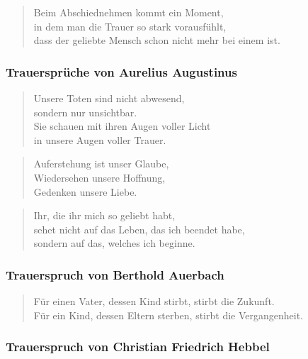 \documentclass[ngerman,a4paper,11pt]{scrreprt}
\begin{document}
\begin{verse}
Beim Abschiednehmen kommt ein Moment, \\
in dem man die Trauer so stark vorausfühlt, \\
dass der geliebte Mensch schon nicht mehr bei einem ist. \\
\end{verse}

\subsubsection*{Trauersprüche von Aurelius Augustinus}
\label{sec-1-1-1-3-6}

\begin{verse}
Unsere Toten sind nicht abwesend, \\
sondern nur unsichtbar. \\
Sie schauen mit ihren Augen voller Licht \\
in unsere Augen voller Trauer. \\
\end{verse}

\begin{verse}
Auferstehung ist unser Glaube, \\
Wiedersehen unsere Hoffnung, \\
Gedenken unsere Liebe. \\
\end{verse}

\begin{verse}
Ihr, die ihr mich so geliebt habt, \\
sehet nicht auf das Leben, das ich beendet habe, \\
sondern auf das, welches ich beginne. \\
\end{verse}

\subsubsection*{Trauerspruch von Berthold Auerbach}
\label{sec-1-1-1-3-7}

\begin{verse}
Für einen Vater, dessen Kind stirbt, stirbt die Zukunft. \\
Für ein Kind, dessen Eltern sterben, stirbt die Vergangenheit. \\
\end{verse}

\subsubsection*{Trauerspruch von Christian Friedrich Hebbel}
\label{sec-1-1-1-3-8}
\end{document}
